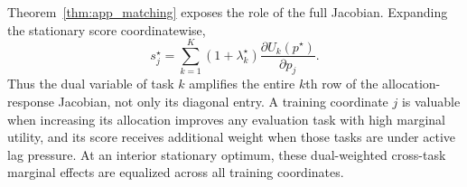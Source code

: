 Theorem~\ref{thm:app_matching} exposes the role of the full Jacobian. Expanding the stationary score coordinatewise,
\begin{equation}
    s_j^\star
    =
    \sum_{k=1}^K
    (1+\lambda_k^\star)
    \frac{\partial U_k(p^\star)}{\partial p_j}.
    \label{eq:app_cross_task_matching}
\end{equation}
Thus the dual variable of task $k$ amplifies the entire $k$th row of the allocation-response Jacobian, not only its diagonal entry. A training coordinate $j$ is valuable when increasing its allocation improves any evaluation task with high marginal utility, and its score receives additional weight when those tasks are under active lag pressure. At an interior stationary optimum, these dual-weighted cross-task marginal effects are equalized across all training coordinates.
